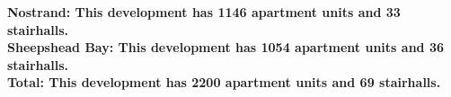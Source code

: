 \bf{Nostrand}: This development has 1146 apartment units and 33 stairhalls.\\\bf{Sheepshead Bay}: This development has 1054 apartment units and 36 stairhalls.\\\bf{Total}: This development has 2200 apartment units and 69 stairhalls.\\